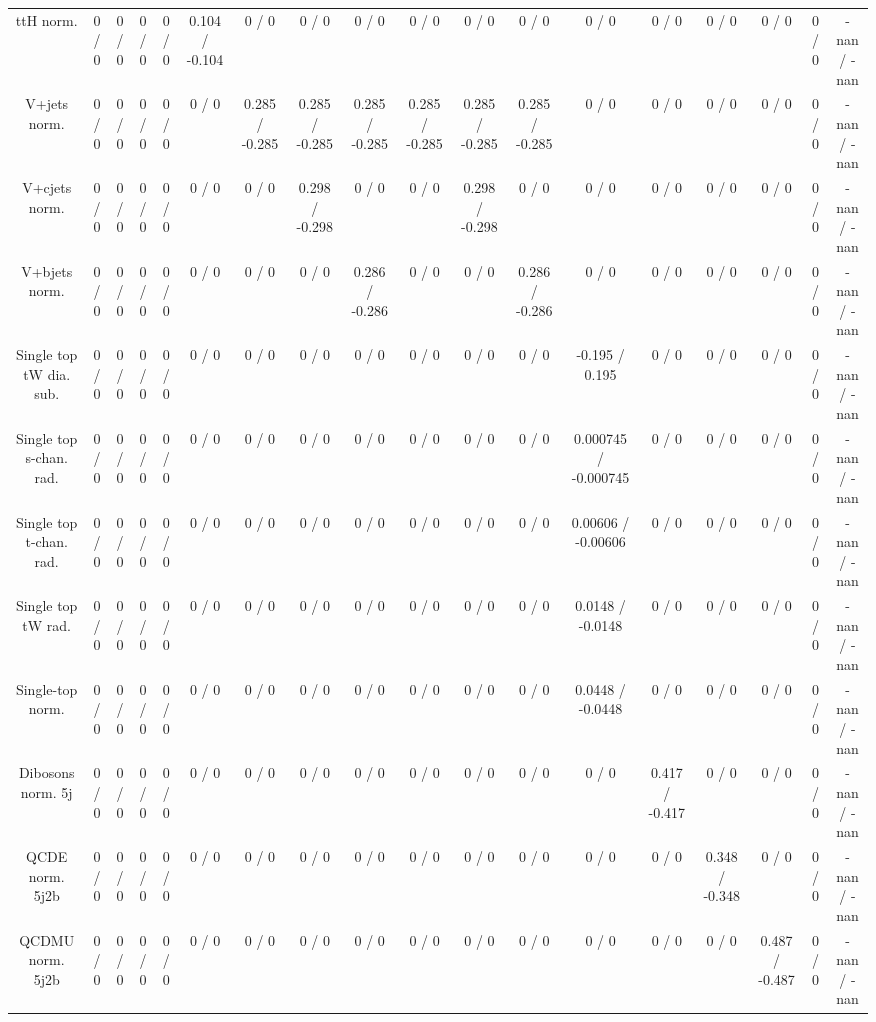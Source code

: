 \documentclass[10pt]{article}
\begin{document}
\begin{table}[htbp]
\begin{center}
\begin{tabular}{|c|c|c|c|c|c|c|c|c|c|c|c|c|c|c|c|c|c|}
  ttH norm. & 0 / 0 & 0 / 0 & 0 / 0 & 0 / 0 & 0.104 / -0.104 & 0 / 0 & 0 / 0 & 0 / 0 & 0 / 0 & 0 / 0 & 0 / 0 & 0 / 0 & 0 / 0 & 0 / 0 & 0 / 0 & 0 / 0 & -nan / -nan \\ 
  V+jets norm. & 0 / 0 & 0 / 0 & 0 / 0 & 0 / 0 & 0 / 0 & 0.285 / -0.285 & 0.285 / -0.285 & 0.285 / -0.285 & 0.285 / -0.285 & 0.285 / -0.285 & 0.285 / -0.285 & 0 / 0 & 0 / 0 & 0 / 0 & 0 / 0 & 0 / 0 & -nan / -nan \\ 
  V+cjets norm. & 0 / 0 & 0 / 0 & 0 / 0 & 0 / 0 & 0 / 0 & 0 / 0 & 0.298 / -0.298 & 0 / 0 & 0 / 0 & 0.298 / -0.298 & 0 / 0 & 0 / 0 & 0 / 0 & 0 / 0 & 0 / 0 & 0 / 0 & -nan / -nan \\ 
  V+bjets norm. & 0 / 0 & 0 / 0 & 0 / 0 & 0 / 0 & 0 / 0 & 0 / 0 & 0 / 0 & 0.286 / -0.286 & 0 / 0 & 0 / 0 & 0.286 / -0.286 & 0 / 0 & 0 / 0 & 0 / 0 & 0 / 0 & 0 / 0 & -nan / -nan \\ 
  Single top tW dia. sub. & 0 / 0 & 0 / 0 & 0 / 0 & 0 / 0 & 0 / 0 & 0 / 0 & 0 / 0 & 0 / 0 & 0 / 0 & 0 / 0 & 0 / 0 & -0.195 / 0.195 & 0 / 0 & 0 / 0 & 0 / 0 & 0 / 0 & -nan / -nan \\ 
  Single top s-chan. rad. & 0 / 0 & 0 / 0 & 0 / 0 & 0 / 0 & 0 / 0 & 0 / 0 & 0 / 0 & 0 / 0 & 0 / 0 & 0 / 0 & 0 / 0 & 0.000745 / -0.000745 & 0 / 0 & 0 / 0 & 0 / 0 & 0 / 0 & -nan / -nan \\ 
  Single top t-chan. rad. & 0 / 0 & 0 / 0 & 0 / 0 & 0 / 0 & 0 / 0 & 0 / 0 & 0 / 0 & 0 / 0 & 0 / 0 & 0 / 0 & 0 / 0 & 0.00606 / -0.00606 & 0 / 0 & 0 / 0 & 0 / 0 & 0 / 0 & -nan / -nan \\ 
  Single top tW rad. & 0 / 0 & 0 / 0 & 0 / 0 & 0 / 0 & 0 / 0 & 0 / 0 & 0 / 0 & 0 / 0 & 0 / 0 & 0 / 0 & 0 / 0 & 0.0148 / -0.0148 & 0 / 0 & 0 / 0 & 0 / 0 & 0 / 0 & -nan / -nan \\ 
  Single-top norm. & 0 / 0 & 0 / 0 & 0 / 0 & 0 / 0 & 0 / 0 & 0 / 0 & 0 / 0 & 0 / 0 & 0 / 0 & 0 / 0 & 0 / 0 & 0.0448 / -0.0448 & 0 / 0 & 0 / 0 & 0 / 0 & 0 / 0 & -nan / -nan \\ 
  Dibosons norm. 5j & 0 / 0 & 0 / 0 & 0 / 0 & 0 / 0 & 0 / 0 & 0 / 0 & 0 / 0 & 0 / 0 & 0 / 0 & 0 / 0 & 0 / 0 & 0 / 0 & 0.417 / -0.417 & 0 / 0 & 0 / 0 & 0 / 0 & -nan / -nan \\ 
  QCDE norm. 5j2b & 0 / 0 & 0 / 0 & 0 / 0 & 0 / 0 & 0 / 0 & 0 / 0 & 0 / 0 & 0 / 0 & 0 / 0 & 0 / 0 & 0 / 0 & 0 / 0 & 0 / 0 & 0.348 / -0.348 & 0 / 0 & 0 / 0 & -nan / -nan \\ 
  QCDMU norm. 5j2b & 0 / 0 & 0 / 0 & 0 / 0 & 0 / 0 & 0 / 0 & 0 / 0 & 0 / 0 & 0 / 0 & 0 / 0 & 0 / 0 & 0 / 0 & 0 / 0 & 0 / 0 & 0 / 0 & 0.487 / -0.487 & 0 / 0 & -nan / -nan \\ 

\end{tabular}
\end{center}
\end{table}
\end{document}
